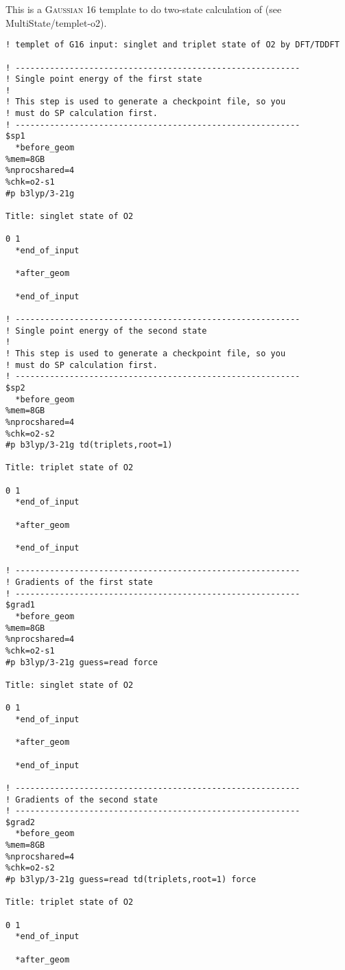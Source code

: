 \documentclass[UTF8]{article}
\begin{document}
This is a \textsc{Gaussian} 16 template to do two-state calculation of  (see MultiState/templet-o2).
\begin{lstlisting}[alsoletter={$*},
morekeywords={$sp1,$grad1,$freq1,$sp2,$grad2,$freq2,*before_geom,*after_geom,*end_of_input}]
! templet of G16 input: singlet and triplet state of O2 by DFT/TDDFT

! ----------------------------------------------------------
! Single point energy of the first state
!
! This step is used to generate a checkpoint file, so you
! must do SP calculation first.
! ----------------------------------------------------------
$sp1
  *before_geom
%mem=8GB
%nprocshared=4
%chk=o2-s1
#p b3lyp/3-21g

Title: singlet state of O2

0 1
  *end_of_input

  *after_geom

  *end_of_input

! ----------------------------------------------------------
! Single point energy of the second state
!
! This step is used to generate a checkpoint file, so you
! must do SP calculation first.
! ----------------------------------------------------------
$sp2
  *before_geom
%mem=8GB
%nprocshared=4
%chk=o2-s2
#p b3lyp/3-21g td(triplets,root=1)

Title: triplet state of O2

0 1
  *end_of_input

  *after_geom

  *end_of_input

! ----------------------------------------------------------
! Gradients of the first state
! ----------------------------------------------------------
$grad1
  *before_geom
%mem=8GB
%nprocshared=4
%chk=o2-s1
#p b3lyp/3-21g guess=read force

Title: singlet state of O2

0 1
  *end_of_input

  *after_geom

  *end_of_input

! ----------------------------------------------------------
! Gradients of the second state
! ----------------------------------------------------------
$grad2
  *before_geom
%mem=8GB
%nprocshared=4
%chk=o2-s2
#p b3lyp/3-21g guess=read td(triplets,root=1) force

Title: triplet state of O2

0 1
  *end_of_input

  *after_geom


\end{lstlisting}
\end{document}
